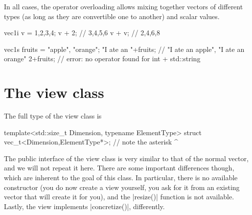 \documentclass[12pt]{report}
\newenvironment{example}
{
    \begin{mdframed}[style=example,frametitle={Example}]
}
{
    \end{mdframed}
}
\begin{document}

In all cases, the operator overloading allows mixing together vectors of different types (as long as they are convertible one to another) and scalar values.

\begin{example}
\begin{cppcode}
vec1i v = {1,2,3,4};
v + 2; // {3,4,5,6}
v + v; // {2,4,6,8}

vec1s fruits = {"apple", "orange"};
"I ate an "+fruits; // {"I ate an apple", "I ate an orange"}
2+fruits;           // error: no operator found for int + std::string
\end{cppcode}
\end{example}

\section{The view class \label{SEC:core:view}}

The full type of the view class is
\begin{cppcode}
template<std::size_t Dimension, typename ElementType>
struct vec_t<Dimension,ElementType*>;
//              note the asterisk ^
\end{cppcode}

The public interface of the view class is very similar to that of the normal vector, and we will not repeat it here. There are some important differences though, which are inherent to the goal of this class. In particular, there is no available constructor (you do now create a view yourself, you ask for it from an existing vector that will create it for you), and the \cppinline|resize()| function is not available. Lastly, the view implements \cppinline|concretize()|, differently.
\end{document}
